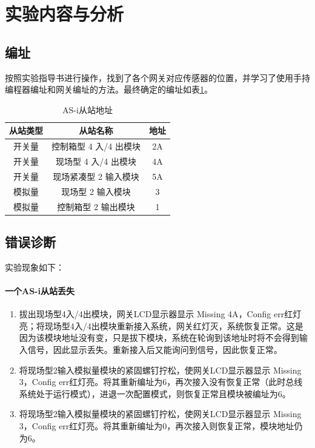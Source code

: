 \section{实验内容与分析}
\subsection{编址}
按照实验指导书进行操作，找到了各个网关对应传感器的位置，并学习了使用手持编程器编址和网关编址的方法。最终确定的编址如表\ref{tab:aa}。

\begin{table}[htbp]
\centering
\begin{tabular}{|c|c|c|}
	\hline
	从站类型 & 从站名称 & 地址 \\
	\hline
	开关量 & 控制箱型 4 入/4 出模块 & 2A \\
	开关量 & 现场型 4 入/4 出模块 & 4A \\
	开关量 & 现场紧凑型 2 输入模块 & 5A \\
	模拟量 & 现场型 2 输入模块 & 3 \\
	模拟量 & 控制箱型 2 输出模块 & 1 \\
	\hline
\end{tabular}
\caption{AS-i从站地址}
\label{tab:aa}
\end{table}

\subsection{错误诊断}
实验现象如下：
\paragraph{一个AS-i从站丢失}
\begin{enumerate}
\item 拔出现场型4入/4出模块，网关LCD显示器显示 {\ttfamily Missing 4A}，Config err红灯亮；将现场型4入/4出模块重新接入系统，网关红灯灭，系统恢复正常。这是因为该模块地址没有变，只是拔下模块，系统在轮询到该地址时将不会得到输入信号，因此显示丢失。重新接入后又能询问到信号，因此恢复正常。
\item 将现场型2输入模拟量模块的紧固螺钉拧松，使网关LCD显示器显示 {\ttfamily Missing 3}，Config err红灯亮。将其重新编址为6，再次接入没有恢复正常（此时总线系统处于运行模式），进退一次配置模式，则恢复正常且模块被编址为6。
\item 将现场型2输入模拟量模块的紧固螺钉拧松，使网关LCD显示器显示 {\ttfamily Missing 3}，Config err红灯亮。将其重新编址为0，再次接入则恢复正常，模块地址仍为6。
\end{enumerate}
